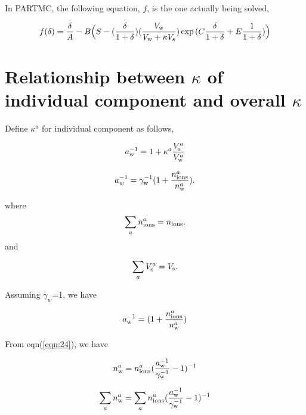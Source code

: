 \documentclass[12pt]{article}
\begin{document}
In PARTMC, the following equation, $f$, is the one actually being solved,

\begin{equation}\label{eqn:22b}
f(\delta)=\frac{\delta}{A}-B\Big(S-(\frac{\delta}{1+\delta}) (\frac{V_{\rm w}}{V_{\rm w}+\kappa V_{\rm s}})\exp{(C \frac{\delta}{1+\delta} +E \frac{1}{1+\delta})}\Big)
\end{equation}

\section{Relationship between $\kappa$ of individual component and overall $\kappa$}

Define $\kappa^{a}$ for individual component as follows, 

\begin{equation}\label{eqn:23}
a_{\rm w}^{-1}=1+\kappa^{a} \frac{V_{\rm s}^{a}}{V_{\rm w}^{a}} 
\end{equation}

\begin{equation}\label{eqn:24}
a_{w}^{-1}=\gamma_{\rm w}^{-1} (1+\frac{n_{\rm ions}^{a}}{n_{\rm w}^{a}}).
\end{equation}

where
\begin{equation}\label{eqn:25}
\sum_{a} n_{\rm ions}^{a}=n_{\rm ions}.
\end{equation}
 and 
 
\begin{equation}\label{eqn:25}
\sum_{a} V_{\rm s}^{a}=V_{\rm s}.
\end{equation}

 
Assuming $\gamma_{w}$=1, we have 

\begin{equation}\label{eqn:26}
a_{\rm w}^{-1}=(1+\frac{n_{\rm ions}^{a}}{n_{\rm w}^{a}})
\end{equation}

From eqn(\ref{eqn:24}), we have

\begin{equation}\label{eqn:27}
n_{\rm w}^{a}=n_{\rm ions}^{a}(\frac{a_{\rm w}^{-1}}{\gamma_{\rm w}^{-1}}-1)^{-1}
\end{equation}

\begin{equation}
\sum_{a} n_{\rm w}^{a}=\sum_{a}n_{\rm ions}^{a}(\frac{a_{\rm w}^{-1}}{\gamma_{\rm w}^{-1}}-1)^{-1}
\end{equation}
\end{document}
